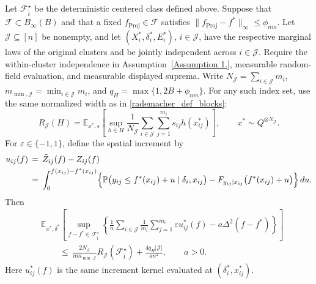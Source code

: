 \documentclass[twoside,11pt]{article}
\newenvironment{revision}{\color{revisionred}}{}
\begin{document}
\begin{revision}
\begin{lemma}
\label{col_tilde_E_1}
Let $\mathcal F_{\tilde t}^{\star}$ be the deterministic centered class
defined above. Suppose that $\mathcal F\subset B_\infty(B)$ and that a
fixed $f_{\text{Proj}}\in\mathcal F$ satisfies
$\|f_{\text{Proj}}-f^*\|_\infty\leq\phi_{nm}$.
Let $\mathcal J\subseteq[n]$ be nonempty, and let
$(X_i^*,\delta_i^*,E_i^*)$, $i\in\mathcal J$, have the respective
marginal laws of the original clusters and be jointly independent
across $i\in\mathcal J$. Require the within-cluster
independence in Assumption~\ref{Assumption 1.}, measurable random-field
evaluation, and measurable displayed suprema.
Write $N_{\mathcal J}=\sum_{i\in\mathcal J}m_i$,
$m_{\min,\mathcal J}=\min_{i\in\mathcal J}m_i$, and
$q_H=\max\{1,2B+\phi_{nm}\}$. For any such index set, use the
same normalized width as in \eqref{rademacher_def_blocks}:
\begin{equation}
\label{eq_nonconvex_general_block_width}
R_{\mathcal J}(H)
=\mathbb E_{x^*,s}\left[
\sup_{h\in H}\frac1{N_{\mathcal J}}
\sum_{i\in\mathcal J}\sum_{j=1}^{m_i}s_{ij}h(x_{ij}^*)\right],
\qquad x^*\sim Q^{\otimes N_{\mathcal J}}.
\end{equation}
For $\varepsilon\in\{-1,1\}$, define the spatial increment by
\begin{equation}
\label{def_uij}
\begin{aligned}
u_{ij}(f)
&\,=\,\tilde Z_{ij}(f)-Z_{ij}(f)\\
&\,=\,\int_0^{f(x_{ij})-f^*(x_{ij})}
\Bigl\{
\mathbb P\bigl(y_{ij}\leq f^*(x_{ij})+u\mid\delta_i,x_{ij}\bigr)
-
F_{y_{ij}\mid x_{ij}}
  \bigl(f^*(x_{ij})+u\bigr)
\Bigr\}\,du .
\end{aligned}
\end{equation}
Then
\begin{equation}
\label{eq_nonconvex_spatial_component}
\begin{aligned}
&\mathbb E_{x^*,\delta^*}\left[
\sup_{f-f^*\in\mathcal F_{\tilde t}^{\star}}
\left\{
\frac1n\sum_{i\in\mathcal J}\frac1{m_i}\sum_{j=1}^{m_i}
\varepsilon u_{ij}^*(f)-a\Delta^2(f-f^*)
\right\}\right]\\
&\qquad\,\leq\,
\frac{2N_{\mathcal J}}{n m_{\min,\mathcal J}}
R_{\mathcal J}(\mathcal F_{\tilde t}^{\star})
+\frac{4q_H|\mathcal J|}{a n^2},
\qquad a>0.
\end{aligned}
\end{equation}
Here $u_{ij}^*(f)$ is the same increment kernel evaluated at
$(\delta_i^*,x_{ij}^*)$.
\end{lemma}


\end{revision}
\end{document}
